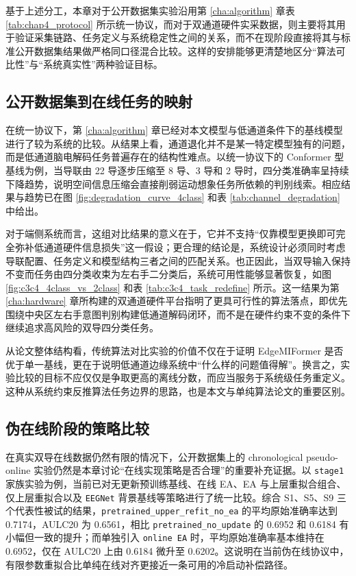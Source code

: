 基于上述分工，本章对于公开数据集实验沿用第 \ref{cha:algorithm} 章表 \ref{tab:chap4_protocol} 所示统一协议，而对于双通道硬件实采数据，则主要将其用于验证采集链路、任务定义与系统稳定性之间的关系，而不在现阶段直接将其与标准公开数据集结果做严格同口径混合比较。这样的安排能够更清楚地区分“算法可比性”与“系统真实性”两种验证目标。

\subsection{公开数据集到在线任务的映射}

在统一协议下，第 \ref{cha:algorithm} 章已经对本文模型与低通道条件下的基线模型进行了较为系统的比较。从结果上看，通道退化并不是某一特定模型独有的问题，而是低通道脑电解码任务普遍存在的结构性难点。以统一协议下的 Conformer 型基线为例，当导联由 22 导逐步压缩至 8 导、3 导和 2 导时，四分类准确率呈持续下降趋势，说明空间信息压缩会直接削弱运动想象任务所依赖的判别线索。相应结果与趋势已在图 \ref{fig:degradation_curve_4class} 和表 \ref{tab:channel_degradation} 中给出。

对于端侧系统而言，这组对比结果的意义在于，它并不支持“仅靠模型更换即可完全弥补低通道硬件信息损失”这一假设；更合理的结论是，系统设计必须同时考虑导联配置、任务定义和模型结构三者之间的匹配关系。也正因此，当双导输入保持不变而任务由四分类收束为左右手二分类后，系统可用性能够显著恢复，如图 \ref{fig:c3c4_4class_vs_2class} 和表 \ref{tab:c3c4_task_redefine} 所示。这一结果为第 \ref{cha:hardware} 章所构建的双通道硬件平台指明了更具可行性的算法落点，即优先围绕中央区左右手意图判别构建低通道解码闭环，而不是在硬件约束不变的条件下继续追求高风险的双导四分类任务。

从论文整体结构看，传统算法对比实验的价值不仅在于证明 EdgeMIFormer 是否优于单一基线，更在于说明低通道边缘系统中“什么样的问题值得解”。换言之，实验比较的目标不应仅仅是争取更高的离线分数，而应当服务于系统级任务重定义。这种从系统约束反推算法任务边界的思路，也是本文与单纯算法论文的重要区别。

\subsection{伪在线阶段的策略比较}

在真实双导在线数据仍然有限的情况下，公开数据集上的 chronological pseudo-online 实验仍然是本章讨论“在线实现策略是否合理”的重要补充证据。以 \texttt{stage1} 家族实验为例，当前已对无更新预训练基线、在线 EA、EA 与上层重拟合组合、仅上层重拟合以及 \texttt{EEGNet} 背景基线等策略进行了统一比较。综合 S1、S5、S9 三个代表性被试的结果，\texttt{pretrained\_upper\_refit\_no\_ea} 的平均原始准确率达到 0.7174，AULC20 为 0.6561，相比 \texttt{pretrained\_no\_update} 的 0.6952 和 0.6184 有小幅但一致的提升；而单独引入 \texttt{online EA} 时，平均原始准确率基本维持在 0.6952，仅在 AULC20 上由 0.6184 微升至 0.6202。这说明在当前伪在线协议中，有限参数重拟合比单纯在线对齐更接近一条可用的冷启动补偿路径。

